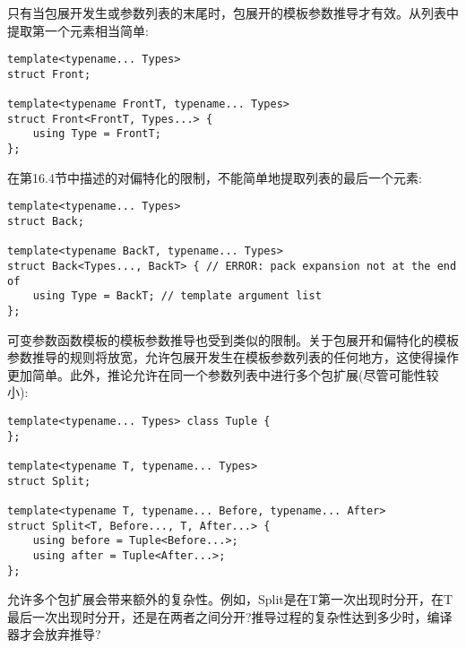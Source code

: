 只有当包展开发生或参数列表的末尾时，包展开的模板参数推导才有效。从列表中提取第一个元素相当简单:

\begin{lstlisting}[style=styleCXX]
template<typename... Types>
struct Front;

template<typename FrontT, typename... Types>
struct Front<FrontT, Types...> {
	using Type = FrontT;
};
\end{lstlisting}

在第16.4节中描述的对偏特化的限制，不能简单地提取列表的最后一个元素:

\begin{lstlisting}[style=styleCXX]
template<typename... Types>
struct Back;

template<typename BackT, typename... Types>
struct Back<Types..., BackT> { // ERROR: pack expansion not at the end of
	using Type = BackT; // template argument list
};
\end{lstlisting}

可变参数函数模板的模板参数推导也受到类似的限制。关于包展开和偏特化的模板参数推导的规则将放宽，允许包展开发生在模板参数列表的任何地方，这使得操作更加简单。此外，推论允许在同一个参数列表中进行多个包扩展(尽管可能性较小):

\begin{lstlisting}[style=styleCXX]
template<typename... Types> class Tuple {
};

template<typename T, typename... Types>
struct Split;

template<typename T, typename... Before, typename... After>
struct Split<T, Before..., T, After...> {
	using before = Tuple<Before...>;
	using after = Tuple<After...>;
};
\end{lstlisting}

允许多个包扩展会带来额外的复杂性。例如，Split是在T第一次出现时分开，在T最后一次出现时分开，还是在两者之间分开?推导过程的复杂性达到多少时，编译器才会放弃推导?













































